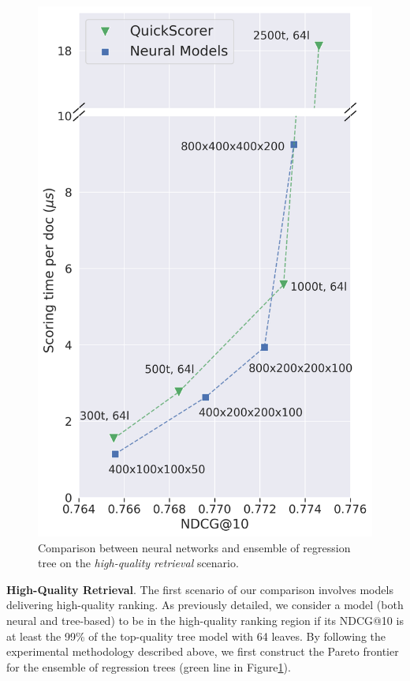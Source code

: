 \begin{figure}[t]
\begin{minipage}[b]{0.517\columnwidth}
\includegraphics[width=\columnwidth]{imgs/istella_final_stretched_broken.png}
\caption*{\footnotesize{\istella}}
\end{minipage}%
\caption{Comparison between neural networks and ensemble of regression tree on the \textit{high-quality retrieval} scenario.\label{fig:hq}}
\end{figure}
\noindent \textbf{High-Quality Retrieval}.
The first scenario of our comparison involves models delivering high-quality ranking. As previously detailed, we consider a model (both neural and tree-based) to be in the high-quality ranking region if its NDCG@10 is at least the 99\% of the top-quality tree model with 64 leaves.
By following the experimental methodology described above, we first construct the Pareto frontier for the ensemble of regression trees (green line in Figure\ref{fig:hq}).
